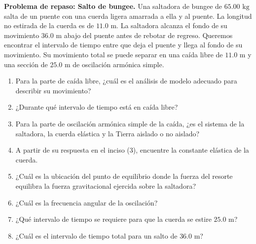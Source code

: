 \item \textbf{Problema de repaso: Salto de bungee.}
Una saltadora de bungee de $65.00\text{ kg}$ salta de un puente con una cuerda ligera amarrada a ella y al puente. La longitud no estirada de la cuerda es de $11.0\text{ m}$. La saltadora alcanza el fondo de su movimiento $36.0\text{ m}$ abajo del puente antes de rebotar de regreso. Queremos encontrar el intervalo de tiempo entre que deja el puente y llega al fondo de su movimiento. Su movimiento total se puede separar en una caída libre de $11.0\text{ m}$ y una sección de $25.0\text{ m}$ de oscilación armónica simple.
\begin{enumerate}
    \item Para la parte de caída libre, ¿cuál es el análisis de modelo adecuado para describir su movimiento?
    \item ¿Durante qué intervalo de tiempo está en caída libre?
    \item Para la parte de oscilación armónica simple de la caída, ¿es el sistema de la saltadora, la cuerda elástica y la Tierra aislado o no aislado?
    \item A partir de su respuesta en el inciso (3), encuentre la constante elástica de la cuerda.
    \item ¿Cuál es la ubicación del punto de equilibrio donde la fuerza del resorte equilibra la fuerza gravitacional ejercida sobre la saltadora?
    \item ¿Cuál es la frecuencia angular de la oscilación?
    \item ¿Qué intervalo de tiempo se requiere para que la cuerda se estire $25.0\text{ m}$?
    \item ¿Cuál es el intervalo de tiempo total para un salto de $36.0\text{ m}$?
\end{enumerate}